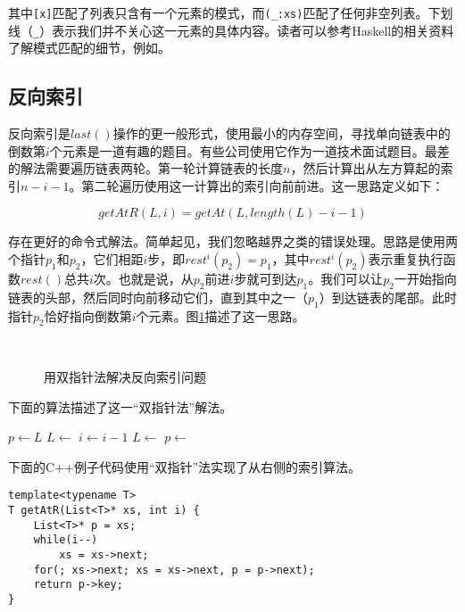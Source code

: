 \documentclass[UTF8]{article}
\begin{document}
其中\texttt{[x]}匹配了列表只含有一个元素的模式，而\texttt{(\_:xs)}匹配了任何非空列表。下划线（\texttt{\_}）表示我们并不关心这一元素的具体内容。读者可以参考Haskell的相关资料了解模式匹配的细节，例如\cite{learn-haskell}。

\subsection{反向索引}

反向索引是$last()$操作的更一般形式，使用最小的内存空间，寻找单向链表中的倒数第$i$个元素是一道有趣的题目。有些公司使用它作为一道技术面试题目。最差的解法需要遍历链表两轮。第一轮计算链表的长度$n$，然后计算出从左方算起的索引$n - i - 1$。第二轮遍历使用这一计算出的索引向前前进。这一思路定义如下：

\[
  getAtR(L, i) = getAt(L, length(L) - i -1)
\]

存在更好的命令式解法。简单起见，我们忽略越界之类的错误处理。思路是使用两个指针$p_1$和$p_2$，它们相距$i$步，即$rest^i(p_2) = p_1$，其中$rest^i(p_2)$表示重复执行函数$rest()$总共$i$次。也就是说，从$p_2$前进$i$步就可到达$p_1$。我们可以让$p_2$一开始指向链表的头部，然后同时向前移动它们，直到其中之一（$p_1$）到达链表的尾部。此时指针$p_2$恰好指向倒数第$i$个元素。图\ref{fig:list-rindex}描述了这一思路。

\begin{figure}[htbp]
    \centering
     \\
    \caption{用双指针法解决反向索引问题} \label{fig:list-rindex}
\end{figure}

下面的算法描述了这一“双指针法”解法。

\begin{algorithmic}[1]
  \State $p \gets L$
    \State $L \gets $ 
    \State $i \gets i - 1$
  \EndWhile
    \State $L \gets$ 
    \State $p \gets$ 
  \EndWhile
  \State \Return {}
\EndFunction
\end{algorithmic}

下面的C++例子代码使用“双指针”法实现了从右侧的索引算法。

\lstset{language=C++}
\begin{lstlisting}
template<typename T>
T getAtR(List<T>* xs, int i) {
    List<T>* p = xs;
    while(i--)
        xs = xs->next;
    for(; xs->next; xs = xs->next, p = p->next);
    return p->key;
}
\end{lstlisting}
\end{document}
